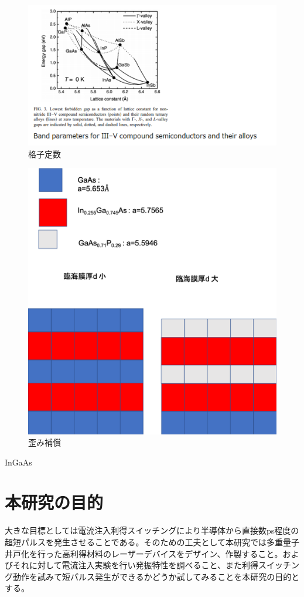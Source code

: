 \begin{figure}[h]
	\centering
	\includegraphics[width=15cm]{figure/fig_1_1_lattice_constance.png}
	\caption{格子定数}
	\label{fig:fig_latice_constancce}
\end{figure}

\begin{figure}[h]
	\centering
	\includegraphics[width=15cm]{figure/fig_1_1_lattice_strain.png}
	\caption{歪み補償}
	\label{fig:fig_1_1_GS_lattice_strain}
\end{figure}
InGaAs
\clearpage
\section{本研究の目的}

大きな目標としては電流注入利得スイッチングにより半導体から直接数ps程度の超短パルスを発生させることである。そのための工夫として本研究では多重量子井戸化を行った高利得材料のレーザーデバイスをデザイン、作製すること。およびそれに対して電流注入実験を行い発振特性を調べること、また利得スイッチング動作を試みて短パルス発生ができるかどうか試してみることを本研究の目的とする。
